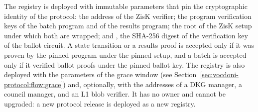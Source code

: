 The registry is deployed with immutable parameters that pin the cryptographic identity of the protocol: the address of the ZisK verifier; the program verification keys of the batch program and of the results program; the root \rootc of the ZisK setup under which both are wrapped; and \ballotvkhash, the SHA-256 digest of the verification key of the ballot circuit. A state transition or a results proof is accepted only if it was proven by the pinned program under the pinned setup, and a batch is accepted only if it verified ballot proofs under the pinned ballot key. The registry is also deployed with the parameters of the grace window (see Section~\ref{sec:vocdoni-protocol:flow:grace}) and, optionally, with the addresses of a \ac{DKG} manager, a council manager, and an L1 blob verifier. It has no owner and cannot be upgraded: a new protocol release is deployed as a new registry.

